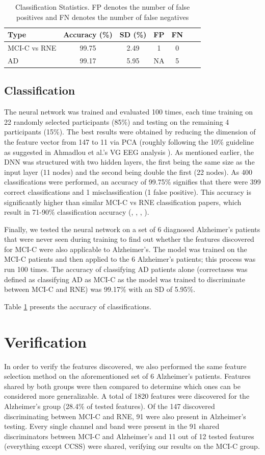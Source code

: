 \documentclass[Afour,times,sageh]{sagej}
\begin{document}
\begin{table}
\centering
\small
\begin{tabular}{l*{5}{c}r}
Type & Accuracy (\%) & SD (\%) & FP & FN\\
\hline
MCI-C vs RNE & 99.75 & 2.49 & 1 & 0\\
AD & 99.17 & 5.95 & NA & 5
\end{tabular}
\caption{Classification Statistics. FP denotes the number of false positives and FN denotes the number of false negatives}
\label{classification}
\end{table}
\subsection{Classification}
The neural network was trained and evaluated 100 times, each time training on 22 randomly selected participants (85\%) and testing on the remaining 4 participants (15\%). The best results were obtained by reducing the dimension of the feature vector from 147 to 11 via PCA (roughly following the 10\% guideline as suggested in Ahmadlou et al.’s VG EEG analysis \cite{Ahmadlou2010}). As mentioned earlier, the DNN was structured with two hidden layers, the first being the same size as the input layer (11 nodes) and the second being double the first (22 nodes). As 400 classifications were performed, an accuracy of 99.75\% signifies that there were 399 correct classifications and 1 misclassification (1 false positive). This accuracy is significantly higher than similar MCI-C vs RNE classification papers, which result in 71-90\% classification accuracy (\citet{MCI80}, \citet{MCI90}, \citet{MCI71}, \citet{MCI85}). 

Finally, we tested the neural network on a set of 6 diagnosed Alzheimer's patients that were never seen during training to find out whether the features discovered for MCI-C were also applicable to Alzheimer's. The model was trained on the MCI-C patients and then applied to the 6 Alzheimer's patients; this process was run 100 times. The accuracy of classifying AD patients alone (correctness was defined as classifying AD as MCI-C as the model was trained to discriminate between MCI-C and RNE) was 99.17\% with an SD of 5.95\%.

Table \ref{classification} presents the accuracy of classifications.
\section{Verification}
In order to verify the features discovered, we also performed the same feature selection method on the aforementioned set of 6 Alzheimer's patients. Features shared by both groups were then compared to determine which ones can be considered more generalizable. A total of 1820 features were discovered for the Alzheimer's group (28.4\% of tested features). Of the 147 discovered discriminating between MCI-C and RNE, 91 were also present in Alzheimer's testing. Every single channel and band were present in the 91 shared discriminators between MCI-C and Alzheimer's and 11 out of 12 tested features (everything except CCSS) were shared, verifying our results on the MCI-C group.
\end{document}
